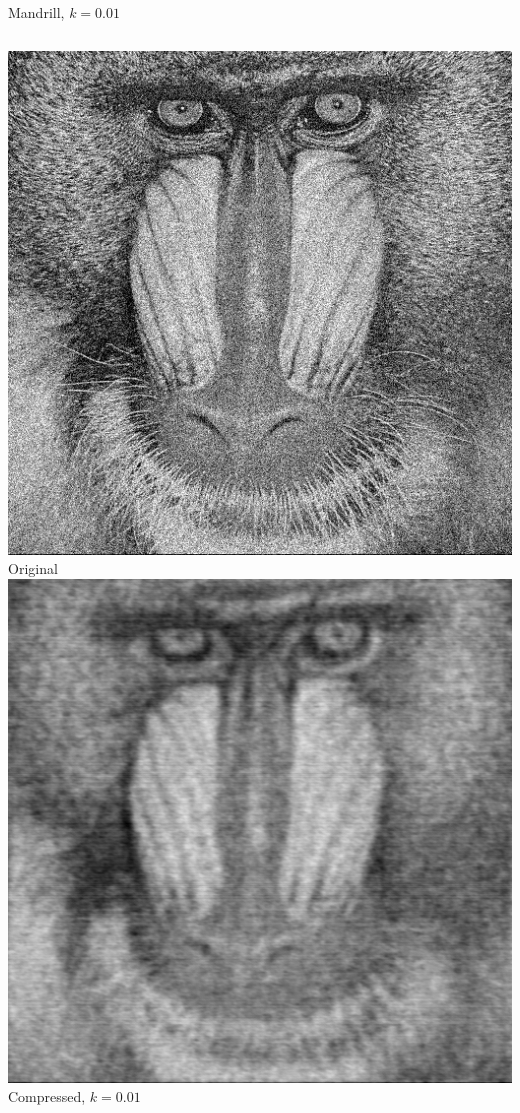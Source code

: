 \documentclass[12pt]{beamer}
\begin{document}
\begin{frame}{Mandrill, \(k=0.01\)}
  \begin{columns}
      \includegraphics[width=\textwidth]{Mandrill.jpg}\\
      \footnotesize Original
      \includegraphics[width=\textwidth]{Mandrill_k01.png}\\
      \footnotesize Compressed, \(k=0.01\)
  \end{columns}
\end{frame}
\end{document}
